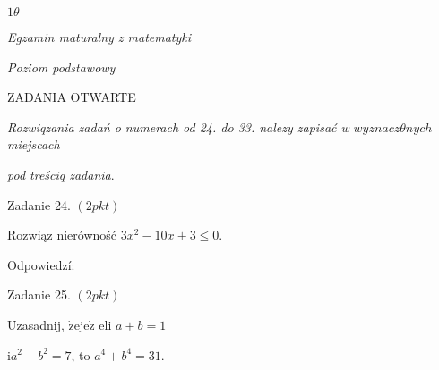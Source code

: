 \documentclass[a4paper,12pt]{article}
\begin{document}
$ 1\theta$

{\it Egzamin maturalny z matematyki}

{\it Poziom podstawowy}

ZADANIA OTWARTE

{\it Rozwiqzania zadań o numerach od 24. do 33. nalezy zapisać w} $wyznacz\theta nych$ {\it miejscach}

{\it pod treściq zadania}.

Zadanie 24. $(2pkt)$

Rozwiąz nierówność $3x^{2}-10x+3\leq 0.$

Odpowiedzí:

Zadanie 25. $(2pkt)$

Uzasadnij, $\dot{\mathrm{z}}\mathrm{e}\mathrm{j}\mathrm{e}\dot{\mathrm{z}}$ eli $a+b=1$

$\mathrm{i} a^{2}+b^{2}=7$, to $a^{4}+b^{4}=31.$
\end{document}
